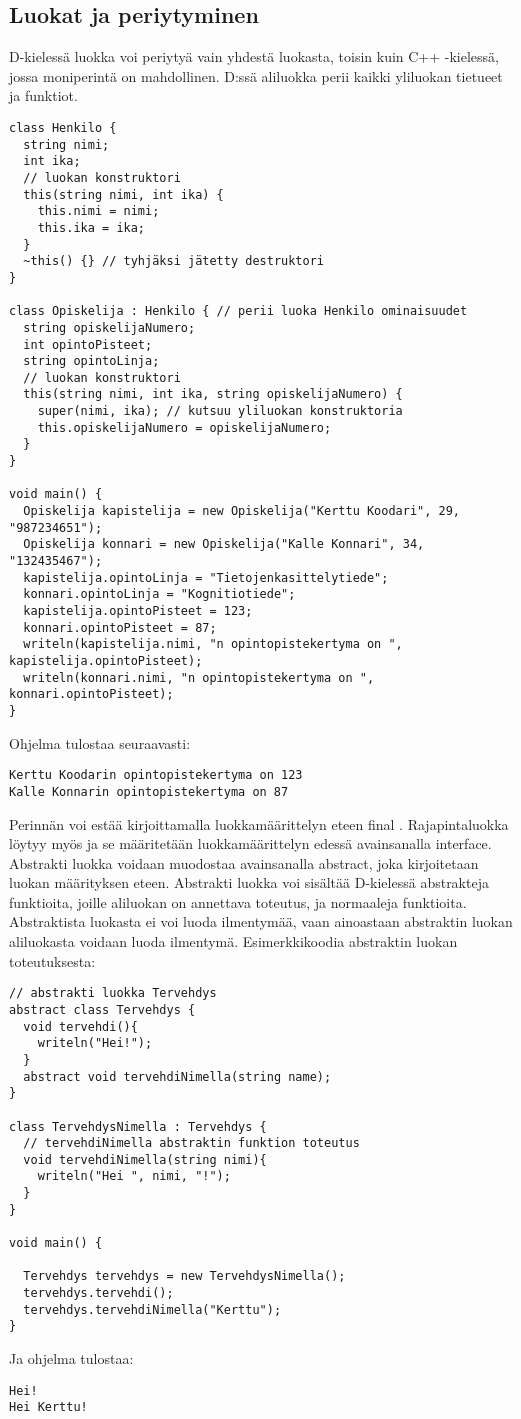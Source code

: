 \documentclass[11pt,oneside,a4paper]{article}
\begin{document}
\subsection{Luokat ja periytyminen}
D-kielessä luokka voi periytyä vain yhdestä luokasta, toisin kuin C++ -kielessä,
jossa moniperintä on mahdollinen. D:ssä aliluokka perii kaikki yliluokan
tietueet ja funktiot. 
\begin{verbatim}
class Henkilo {
  string nimi;
  int ika;
  // luokan konstruktori
  this(string nimi, int ika) {
    this.nimi = nimi;
    this.ika = ika;
  }
  ~this() {} // tyhjäksi jätetty destruktori
}

class Opiskelija : Henkilo { // perii luoka Henkilo ominaisuudet
  string opiskelijaNumero;
  int opintoPisteet;
  string opintoLinja;
  // luokan konstruktori
  this(string nimi, int ika, string opiskelijaNumero) { 
    super(nimi, ika); // kutsuu yliluokan konstruktoria
    this.opiskelijaNumero = opiskelijaNumero;
  }
}

void main() {
  Opiskelija kapistelija = new Opiskelija("Kerttu Koodari", 29, "987234651");
  Opiskelija konnari = new Opiskelija("Kalle Konnari", 34, "132435467");
  kapistelija.opintoLinja = "Tietojenkasittelytiede";
  konnari.opintoLinja = "Kognitiotiede";
  kapistelija.opintoPisteet = 123;
  konnari.opintoPisteet = 87;
  writeln(kapistelija.nimi, "n opintopistekertyma on ",
kapistelija.opintoPisteet);
  writeln(konnari.nimi, "n opintopistekertyma on ", konnari.opintoPisteet);
}
\end{verbatim}
Ohjelma tulostaa seuraavasti:

\begin{verbatim}
Kerttu Koodarin opintopistekertyma on 123
Kalle Konnarin opintopistekertyma on 87
\end{verbatim}
Perinnän voi estää kirjoittamalla luokkamäärittelyn eteen final \cite{DLA13}.
Rajapintaluokka löytyy myös ja se määritetään luokkamäärittelyn edessä
avainsanalla interface. 
Abstrakti luokka voidaan muodostaa avainsanalla abstract, joka kirjoitetaan
luokan määrityksen eteen. Abstrakti luokka voi sisältää D-kielessä abstrakteja
funktioita, joille aliluokan on annettava toteutus, ja normaaleja funktioita.
Abstraktista luokasta ei voi luoda ilmentymää, vaan ainoastaan abstraktin luokan
aliluokasta voidaan luoda ilmentymä. Esimerkkikoodia abstraktin luokan
toteutuksesta:
\begin{verbatim}
// abstrakti luokka Tervehdys
abstract class Tervehdys { 
  void tervehdi(){ 
    writeln("Hei!"); 
  } 
  abstract void tervehdiNimella(string name); 
} 

class TervehdysNimella : Tervehdys { 
  // tervehdiNimella abstraktin funktion toteutus
  void tervehdiNimella(string nimi){ 
    writeln("Hei ", nimi, "!"); 
  } 
} 

void main() {

  Tervehdys tervehdys = new TervehdysNimella(); 
  tervehdys.tervehdi(); 
  tervehdys.tervehdiNimella("Kerttu"); 
}
\end{verbatim}
Ja ohjelma tulostaa:
\begin{verbatim}
Hei!
Hei Kerttu!
\end{verbatim}
\end{document}
